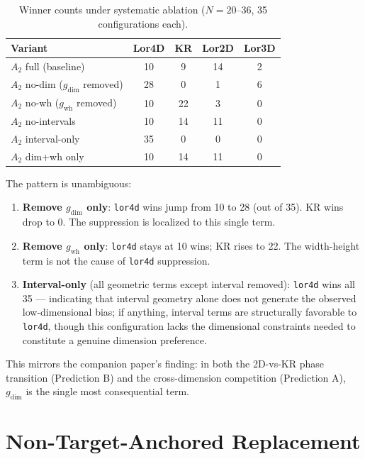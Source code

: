 \documentclass[entropy,article,submit,pdftex,moreauthors]{Definitions/mdpi}
\begin{document}
\begin{table}[H]
\caption{Winner counts under systematic ablation ($N = 20$--$36$, 35 configurations each).\label{tab:ablation}}
\begin{tabular}{lcccc}
\toprule
\textbf{Variant} & \textbf{Lor4D} & \textbf{KR} & \textbf{Lor2D} & \textbf{Lor3D} \\
\midrule
$A_2$ full (baseline) & 10 & 9 & 14 & 2 \\
$A_2$ no-dim ($g_{\text{dim}}$ removed) & 28 & 0 & 1 & 6 \\
$A_2$ no-wh ($g_{\text{wh}}$ removed) & 10 & 22 & 3 & 0 \\
$A_2$ no-intervals & 10 & 14 & 11 & 0 \\
$A_2$ interval-only & 35 & 0 & 0 & 0 \\
$A_2$ dim+wh only & 10 & 14 & 11 & 0 \\
\bottomrule
\end{tabular}
\end{table}

The pattern is unambiguous:
\begin{enumerate}[nosep]
    \item \textbf{Remove $g_{\text{dim}}$ only}: \texttt{lor4d} wins jump from 10 to 28 (out of 35). KR wins drop to 0. The suppression is localized to this single term.
    \item \textbf{Remove $g_{\text{wh}}$ only}: \texttt{lor4d} stays at 10 wins; KR rises to 22. The width-height term is not the cause of \texttt{lor4d} suppression.
    \item \textbf{Interval-only} (all geometric terms except interval removed): \texttt{lor4d} wins all 35 --- indicating that interval geometry alone does not generate the observed low-dimensional bias; if anything, interval terms are structurally favorable to \texttt{lor4d}, though this configuration lacks the dimensional constraints needed to constitute a genuine dimension preference.
\end{enumerate}

This mirrors the companion paper's finding: in both the 2D-vs-KR phase transition (Prediction B) and the cross-dimension competition (Prediction A), $g_{\text{dim}}$ is the single most consequential term.

\section{Non-Target-Anchored Replacement}\label{sec:replacement}
\end{document}
